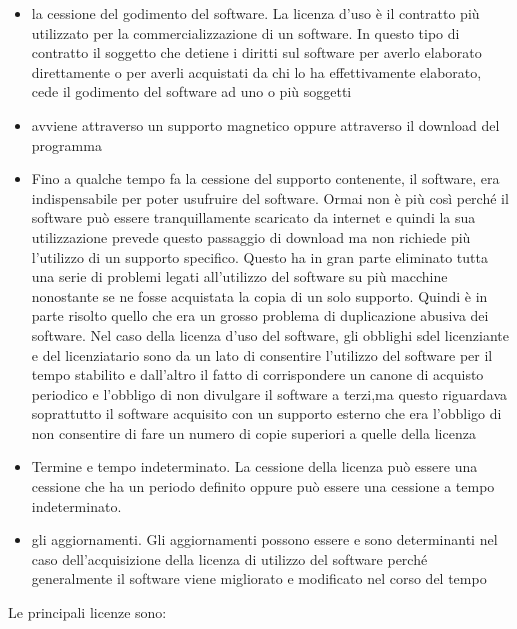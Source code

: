 \begin{itemize}
    \item la cessione del godimento del software. La licenza d'uso è il contratto più utilizzato per la commercializzazione di un software. In questo tipo di contratto il soggetto che detiene i diritti sul software per averlo elaborato direttamente o per averli acquistati da chi lo ha effettivamente elaborato, cede il godimento del software ad uno o più soggetti
    \item avviene attraverso un supporto magnetico oppure attraverso il download del programma
    \item Fino a qualche tempo fa la cessione del supporto contenente, il software, era indispensabile per poter usufruire del software. Ormai non è più così perché il software può essere tranquillamente scaricato da internet e quindi la sua utilizzazione prevede questo passaggio di download ma non richiede più l'utilizzo di un supporto specifico. Questo ha in gran parte eliminato tutta una serie di problemi legati all'utilizzo del software su più macchine nonostante se ne fosse acquistata la copia di un solo supporto. Quindi è in parte risolto quello che era un grosso problema di duplicazione abusiva dei software. Nel caso della licenza d'uso del software, gli obblighi sdel licenziante e del licenziatario sono da un lato di consentire l'utilizzo del software per il tempo stabilito e dall'altro il fatto di corrispondere un canone di acquisto periodico e l'obbligo di non divulgare il software a terzi,ma questo riguardava soprattutto il software acquisito con un supporto esterno che era l'obbligo di non consentire di fare un numero di copie superiori a quelle della licenza
    \item Termine e tempo indeterminato. La cessione della licenza può essere una cessione che ha un periodo definito oppure può essere una cessione a tempo indeterminato.
    \item gli aggiornamenti. Gli aggiornamenti possono essere e sono determinanti nel caso dell'acquisizione della licenza di utilizzo del software perché generalmente il software viene migliorato e modificato nel corso del tempo
 \end{itemize}
 
 

Le principali licenze sono:

